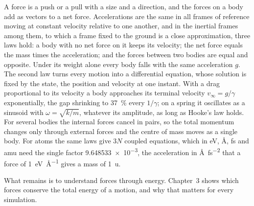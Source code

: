
A force is a push or a pull with a size and a direction, and the forces
on a body add as vectors to a net force. Accelerations are the same in
all frames of reference moving at constant velocity relative to one
another, and in the inertial frames among them, to which a frame fixed
to the ground is a close approximation, three laws hold: a body with no net force on it keeps
its velocity; the net force equals the mass times the acceleration; and
the forces between two bodies are equal and opposite. Under its weight
alone every body falls with the same acceleration $g$. The second law
turns every motion into a differential equation, whose solution is fixed
by the state, the position and velocity at one instant. With a drag
proportional to its velocity a body approaches its terminal velocity
$v_\infty = g/\gamma$ exponentially, the gap shrinking to
\SI{37}{\percent} every $1/\gamma$; on a spring it oscillates as a
sinusoid with $\omega = \sqrt{k/m}$, whatever its amplitude, as long as
Hooke's law holds. For several
bodies the internal forces cancel in pairs, so the total momentum changes
only through external forces and the centre of mass moves as a single
body. For atoms the same laws give $3N$ coupled equations, which in eV,
\AA, fs and amu need the single factor \num{9.648533e-3}, the
acceleration in \si{\angstrom\per\femto\second\squared} that a force of
\SI{1}{\electronvolt\per\angstrom} gives a mass of \SI{1}{\amu}.

What remains is to understand forces through energy. Chapter~3 shows
which forces conserve the total energy of a motion, and why that matters
for every simulation.
